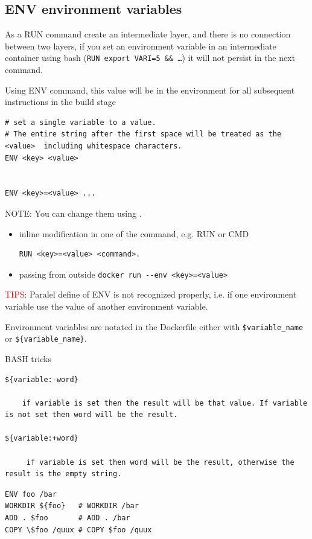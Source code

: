 \subsection{ENV environment variables}
\label{sec:Dockerfile-ENV}

As a RUN command create an intermediate layer, and there is no connection
between two layers, if you set an environment variable in an intermediate
container using bash (\verb!RUN export VARI=5 && …!) it will not persist in the
next command.

Using ENV command, this value will be in the environment for all subsequent
instructions in the build stage
\begin{verbatim}
# set a single variable to a value. 
# The entire string after the first space will be treated as the <value>  including whitespace characters. 
ENV <key> <value>


ENV <key>=<value> ...
\end{verbatim}

NOTE: You can change them using .
\begin{itemize}
  \item inline modification in one of the command, e.g. RUN or CMD

\begin{verbatim}
RUN <key>=<value> <command>.
\end{verbatim}

  \item passing from outside \verb!docker run --env <key>=<value>!
\end{itemize}

\textcolor{red}{TIPS}: Paralel define of ENV is not recognized properly, i.e. if one environment variable use the value of another
environment variable.

Environment variables are notated in the Dockerfile either with 
\verb!$variable_name! or \verb!${variable_name}!. 

BASH tricks
\begin{verbatim}
${variable:-word}

	if variable is set then the result will be that value. If variable is not set then word will be the result.

${variable:+word} 

	 if variable is set then word will be the result, otherwise the result is the empty string.
\end{verbatim}

\begin{verbatim}
ENV foo /bar
WORKDIR ${foo}   # WORKDIR /bar
ADD . $foo       # ADD . /bar
COPY \$foo /quux # COPY $foo /quux
\end{verbatim}

